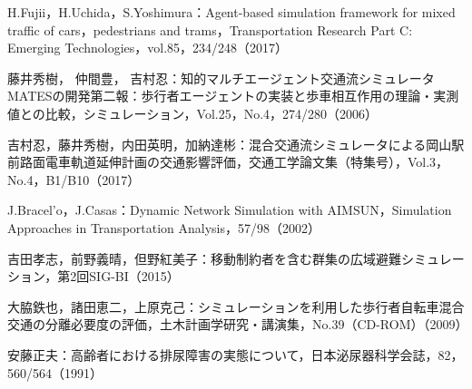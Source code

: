 \begin{thebibliography}{99}
  H.Fujii，H.Uchida，S.Yoshimura：Agent-based simulation framework for mixed traffic of cars，pedestrians and trams，Transportation Research Part C: Emerging Technologies，vol.85，234/248（2017）

  藤井秀樹， 仲間豊， 吉村忍：知的マルチエージェント交通流シミュレータMATESの開発第二報：歩行者エージェントの実装と歩車相互作用の理論・実測値との比較，シミュレーション，Vol.25，No.4，274/280（2006）

  吉村忍，藤井秀樹，内田英明，加納達彬：混合交通流シミュレータによる岡山駅前路面電車軌道延伸計画の交通影響評価，交通工学論文集（特集号），Vol.3，No.4，B1/B10（2017）

  J.Bracel’o，J.Casas：Dynamic Network Simulation with AIMSUN，Simulation Approaches in Transportation Analysis，57/98（2002）

  吉田孝志，前野義晴，但野紅美子：移動制約者を含む群集の広域避難シミュレーション，第2回SIG-BI（2015）

  大脇鉄也，諸田恵二，上原克己：シミュレーションを利用した歩行者自転車混合交通の分離必要度の評価，土木計画学研究・講演集，No.39（CD-ROM）（2009）


  安藤正夫：高齢者における排尿障害の実態について，日本泌尿器科学会誌，82，560/564（1991）
\end{thebibliography}
